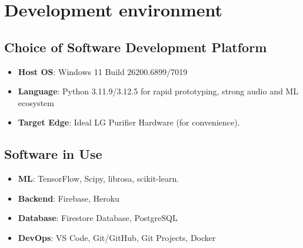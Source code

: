 \documentclass[conference]{IEEEtran}
\begin{document}
\section{Development environment}
    \subsection{\textbf{Choice of Software Development Platform}}
        \begin{itemize}
            \item \textbf{Host OS}: Windows 11 Build 26200.6899/7019 
            \item \textbf{Language}: Python 3.11.9/3.12.5 for rapid prototyping, strong audio and ML ecosystem
            \item \textbf{Target Edge}: Ideal LG Purifier Hardware (for convenience).
        \end{itemize}
    \subsection{\textbf{Software in Use}}
        \begin{itemize}
            \item \textbf{ML}: TensorFlow, Scipy, librosa, scikit-learn.
            \item \textbf{Backend}: Firebase, Heroku
            \item \textbf{Database}: Firestore Database, PostgreSQL
            \item \textbf{DevOps}: VS Code, Git/GitHub, Git Projects, Docker
        \end{itemize}
        
\end{document}
